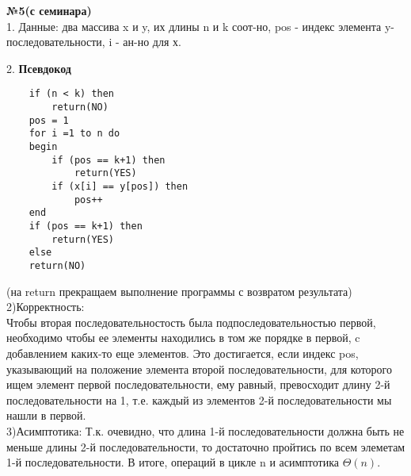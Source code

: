 \documentclass[a4paper,12pt]{article} %
\begin{document}
\textbf{№5(с семинара)}\\
1. Данные: два массива x и y,  их длины n и k соот-но, pos - индекс элемента y-последовательности, i - ан-но для х.

2. \hspace{100pt}\textbf{Псевдокод}
\begin{lstlisting}
	if (n < k) then
		return(NO)
	pos = 1
	for i =1 to n do
	begin
		if (pos == k+1) then
			return(YES)
		if (x[i] == y[pos]) then 
			pos++
	end
	if (pos == k+1) then
		return(YES)
	else		
	return(NO)
\end{lstlisting}
(на return прекращаем выполнение программы с возвратом результата)\\

2)Корректность:\\
Чтобы вторая последовательностость была подпоследовательностью первой, необходимо чтобы ее элементы находились в том же порядке в первой, c  добавлением каких-то еще элементов. Это достигается, если индекс  pos, указывающий на положение элемента второй последовательности, для которого ищем элемент первой последовательности, ему равный, превосходит длину 2-й последовательности на 1, т.е. каждый из элементов 2-й последовательности мы нашли в первой.\\

3)Асимптотика:
Т.к. очевидно, что длина 1-й последовательности должна быть не меньше длины 2-й последовательности, то достаточно пройтись по всем  элеметам 1-й последовательности. В итоге, операций в цикле n и асимптотика $\Theta(n)$.
\end{document}
